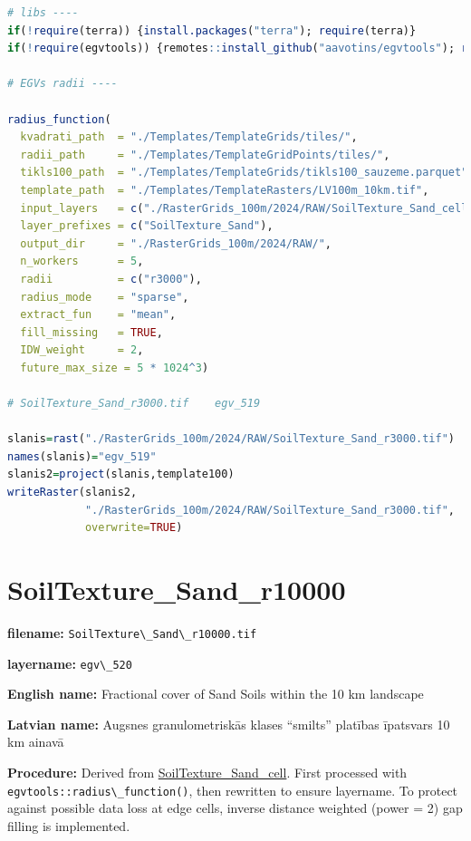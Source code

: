 \documentclass[
]{book}
\newcommand{\passthrough}[1]{#1}
\begin{document}
\begin{lstlisting}[language=R]
# libs ----
if(!require(terra)) {install.packages("terra"); require(terra)}
if(!require(egvtools)) {remotes::install_github("aavotins/egvtools"); require(egvtools)}

# EGVs radii ----

radius_function(
  kvadrati_path  = "./Templates/TemplateGrids/tiles/",
  radii_path     = "./Templates/TemplateGridPoints/tiles/",
  tikls100_path  = "./Templates/TemplateGrids/tikls100_sauzeme.parquet",
  template_path  = "./Templates/TemplateRasters/LV100m_10km.tif",
  input_layers   = c("./RasterGrids_100m/2024/RAW/SoilTexture_Sand_cell.tif"),
  layer_prefixes = c("SoilTexture_Sand"),
  output_dir     = "./RasterGrids_100m/2024/RAW/",
  n_workers      = 5,
  radii          = c("r3000"),
  radius_mode    = "sparse",
  extract_fun    = "mean",
  fill_missing   = TRUE,
  IDW_weight     = 2,
  future_max_size = 5 * 1024^3)

# SoilTexture_Sand_r3000.tif    egv_519

slanis=rast("./RasterGrids_100m/2024/RAW/SoilTexture_Sand_r3000.tif")
names(slanis)="egv_519"
slanis2=project(slanis,template100)
writeRaster(slanis2,
            "./RasterGrids_100m/2024/RAW/SoilTexture_Sand_r3000.tif",
            overwrite=TRUE)
\end{lstlisting}

\section{SoilTexture\_Sand\_r10000}\label{ch06.520}

\textbf{filename:} \passthrough{\lstinline!SoilTexture\_Sand\_r10000.tif!}

\textbf{layername:} \passthrough{\lstinline!egv\_520!}

\textbf{English name:} Fractional cover of Sand Soils within the 10 km landscape

\textbf{Latvian name:} Augsnes granulometriskās klases ``smilts'' platības īpatsvars 10 km ainavā

\textbf{Procedure:} Derived from \hyperref[ch06.516]{SoilTexture\_Sand\_cell}. First processed
with \passthrough{\lstinline!egvtools::radius\_function()!}, then rewritten to ensure layername. To protect against
possible data loss at edge cells, inverse distance weighted (power = 2) gap filling
is implemented.
\end{document}
